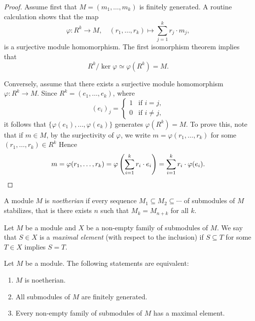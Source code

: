 \begin{proof}
    Assume first that $M=(m_1,\dots,m_k)$ is finitely generated. A routine calculation shows that
    the map
    \[
    \varphi\colon R^k\to M,\quad
    (r_1,\dots,r_k)\mapsto \sum_{j=1}^kr_j\cdot m_j,
    \]
    is a surjective module homomorphism. The first isomorphism theorem implies that 
    \[ 
    R^k/\ker\varphi\simeq\varphi(R^k)=M.
    \]
    
    Conversely, assume that there exists a 
    surjective module homomorphism $\varphi\colon R^k\to M$. Since 
    $R^k=(e_1,\dots,e_k)$, where 
    \[
    (e_i)_j=\begin{cases}
    1 & \text{if $i=j$},\\
    0 & \text{if $i\ne j$},
    \end{cases}
    \]
    it follows that $\{\varphi(e_1),\dots,\varphi(e_k)\}$ generates $\varphi(R^k)=M$. To prove this, note that  
    if $m\in M$, by the surjectivity of $\varphi$, we write $m=\varphi(r_1,\dots,r_k)$ for some $(r_1,\dots,r_k)\in R^k$ 
    Hence  
    \[
    m=\varphi(r_1,\dots,r_k)=\varphi\left(\sum_{i=1}^k r_i\cdot e_i\right)
    =\sum_{i=1}^kr_i\cdot\varphi(e_i).\qedhere
    \]
\end{proof}

\begin{definition}
    A module $M$ is \emph{noetherian} if every sequence $M_1\subseteq M_2\subseteq\cdots$ of submodules of $M$ 
    stabilizes, that is there exists $n$ such that $M_k=M_{n+k}$ for all $k$. 	
\end{definition}

Let $M$ be a module and $X$ be a non-empty 
family of submodules of $M$. We say that $S\in X$ is a \emph{maximal 
element} (with respect to the inclusion) if $S\subseteq T$ for some $T\in X$ implies $S=T$. 

\begin{proposition}
Let $M$ be a module. The following statements are equivalent:
\begin{enumerate}
\item $M$ is noetherian.
\item All submodules of $M$ are finitely generated.
\item Every non-empty family of submodules of $M$ has a maximal element. 	
\end{enumerate}
\end{proposition}

